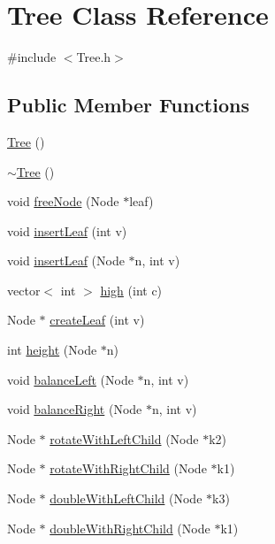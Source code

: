 \hypertarget{class_tree}{\section{Tree Class Reference}
\label{class_tree}
}


{\ttfamily \#include $<$Tree.\+h$>$}

\subsection*{Public Member Functions}
\begin{DoxyCompactItemize}
\item 
\hyperlink{class_tree_ad376a7c639d857312f5de2ef47482f68}{Tree} ()
\item 
\hyperlink{class_tree_abdc38545cf3f588725b5d8b8075b3866}{$\sim$\+Tree} ()
\item 
void \hyperlink{class_tree_a43954affd6d8518535f2b6629731ea8b}{free\+Node} (Node $\ast$leaf)
\item 
void \hyperlink{class_tree_a07a121897ad236658b603c357ec12c77}{insert\+Leaf} (int v)
\item 
void \hyperlink{class_tree_a0805f98d26d5a34be85805fe9ce18d57}{insert\+Leaf} (Node $\ast$n, int v)
\item 
vector$<$ int $>$ \hyperlink{class_tree_aa75485c18c4cdf0c0a348a8228e64921}{high} (int c)
\item 
Node $\ast$ \hyperlink{class_tree_a833b542fb707b6603e078aad2d376f5b}{create\+Leaf} (int v)
\item 
int \hyperlink{class_tree_a5e2f213a7e02174cdccf123086d03e7a}{height} (Node $\ast$n)
\item 
void \hyperlink{class_tree_a652571c872911cb6a68105990fa4c961}{balance\+Left} (Node $\ast$n, int v)
\item 
void \hyperlink{class_tree_af085585fe258878c2f368726bb49aa8a}{balance\+Right} (Node $\ast$n, int v)
\item 
Node $\ast$ \hyperlink{class_tree_a8ce0f0badbd02a7519af521babeaad79}{rotate\+With\+Left\+Child} (Node $\ast$k2)
\item 
Node $\ast$ \hyperlink{class_tree_ae682685590072cc5d524f76ce033074a}{rotate\+With\+Right\+Child} (Node $\ast$k1)
\item 
Node $\ast$ \hyperlink{class_tree_a76c89a5b3b447e678e4af337293f4f37}{double\+With\+Left\+Child} (Node $\ast$k3)
\item 
Node $\ast$ \hyperlink{class_tree_adf9c68df927428232ab36eda2159bc12}{double\+With\+Right\+Child} (Node $\ast$k1)

\end{DoxyCompactItemize}
